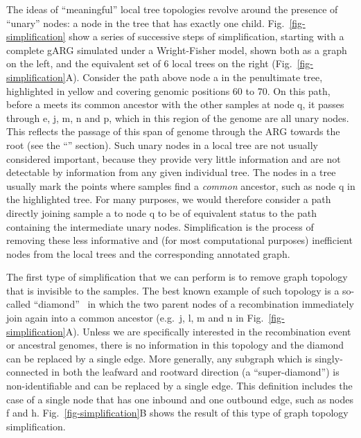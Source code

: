 \documentclass{article}
\begin{document}
The ideas of ``meaningful'' local tree topologies revolve around the
presence of ``unary'' nodes: a node in the tree that has exactly
one child. Fig.~\ref{fig-simplification} show a series of successive steps of
simplification, starting with a complete gARG simulated under a Wright-Fisher
model, shown both as a graph on the left, and the equivalent set of 6
local trees on the right (Fig.~\ref{fig-simplification}A). Consider the path above node
\textsf{a} in the penultimate tree, highlighted in yellow and covering genomic positions
60 to 70. On this path, before \textsf{a} meets its common ancestor with the other samples at
node \textsf{q}, it passes through  \textsf{e},  \textsf{j},  \textsf{m},  \textsf{n} and
\textsf{p}, which in this region of the genome are all unary nodes. This reflects the
passage of this span of genome through the ARG towards the root (see the
``'' section).
Such unary nodes in a local tree are not usually considered important,
because they provide very little information and are not
detectable by information from any given individual tree.
The nodes in a tree usually mark the points where samples find a
 \emph{common} ancestor, such as node \textsf{q} in the highlighted
tree. For many purposes, we would therefore consider a path directly
joining sample \textsf{a} to node \textsf{q} to be of equivalent status to the path
containing the intermediate unary nodes. Simplification is the process of removing
these less informative and (for most computational purposes) inefficient nodes
from the local trees and the corresponding annotated graph.

The first type of simplification that we can perform is to remove
graph topology that is invisible to the samples. The best
known example of such topology is a so-called
``diamond''~\citep{rasmussen2014genome}
in which the two parent nodes of a recombination immediately
join again into a common ancestor (e.g.~\textsf{j}, \textsf{l}, \textsf{m}
and  \textsf{n} in Fig.~\ref{fig-simplification}A).
Unless we are specifically
interested in the recombination event or ancestral genomes,
there is no information in this topology and the diamond can be
replaced by a single edge. More generally, any
subgraph which is singly-connected in both the leafward and
rootward direction (a ``super-diamond'') is non-identifiable and can be
replaced by a single edge. This definition includes the case
of a single node that has one inbound and one outbound edge, such as
nodes \textsf{f} and \textsf{h}.
Fig.~\ref{fig-simplification}B shows the result of this type of
graph topology simplification.
\end{document}
